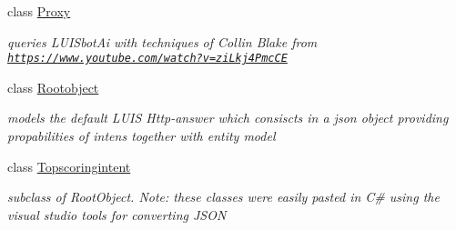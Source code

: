 \begin{DoxyCompactItemize}
class \mbox{\hyperlink{class_listen_to_me_1_1_model_1_1_proxy}{Proxy}}
\begin{DoxyCompactList}\small\item\em queries L\+U\+I\+Sbot\+Ai with techniques of Collin Blake from \href{https://www.youtube.com/watch?v=ziLkj4PmcCE}{\tt https\+://www.\+youtube.\+com/watch?v=zi\+Lkj4\+Pmc\+CE} \end{DoxyCompactList}\item 
class \mbox{\hyperlink{class_listen_to_me_1_1_model_1_1_rootobject}{Rootobject}}
\begin{DoxyCompactList}\small\item\em models the default L\+U\+IS Http-\/answer which consiscts in a json object providing propabilities of intens together with entity model \end{DoxyCompactList}\item 
class \mbox{\hyperlink{class_listen_to_me_1_1_model_1_1_topscoringintent}{Topscoringintent}}
\begin{DoxyCompactList}\small\item\em subclass of Root\+Object. Note\+: these classes were easily pasted in C\# using the visual studio tools for converting J\+S\+ON \end{DoxyCompactList}\end{DoxyCompactItemize}

